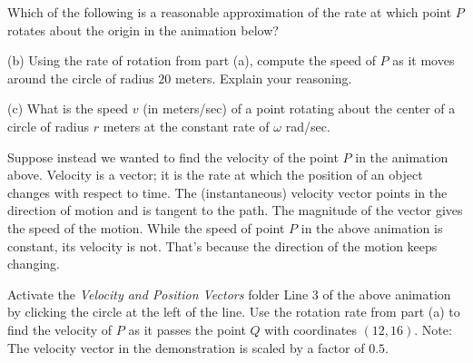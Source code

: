 \documentclass{ximera}
\begin{document}
\begin{exploration}  \label{Qdstsdfgf:Cross}

\begin{question}   \label{Qdfg4bk:Cross}
Which of the following is a reasonable approximation of the rate at which point $P$ rotates about the origin in the animation below?
\begin{multipleChoice}  
\end{multipleChoice}  
\end{question}


(b) Using the rate of rotation from part (a), compute the speed of $P$ as it moves around the circle of radius $20$ meters. Explain your reasoning.

(c) What is the speed $v$ (in meters/sec) of a point rotating about the center of a circle of radius $r$ meters at the constant rate of $\omega$ rad/sec.

 
\begin{onlineOnly}
    \begin{center}
\end{center}
\end{onlineOnly}


Suppose instead we wanted to find the velocity of the point $P$ in the animation above. Velocity is a vector; it is the rate at which the position of an object changes with respect to time. The (instantaneous) velocity vector points in the direction of motion and is  tangent to the path. The magnitude of the vector gives the speed of the motion. While the speed of point $P$ in the above animation is constant, its velocity is not. That's because the direction of the motion keeps changing.

\begin{question}   \label{Q3456457l:Cross}
Activate the {\it Velocity and Position Vectors} folder Line 3 of the above animation by clicking the circle at the left of the line. Use the rotation rate from part (a) to find the velocity of $P$ as it passes the point $Q$ with coordinates $(12,16)$. Note: The velocity vector in the demonstration is scaled by a factor of $0.5$.
\end{question}

\end{exploration}
\end{document}
